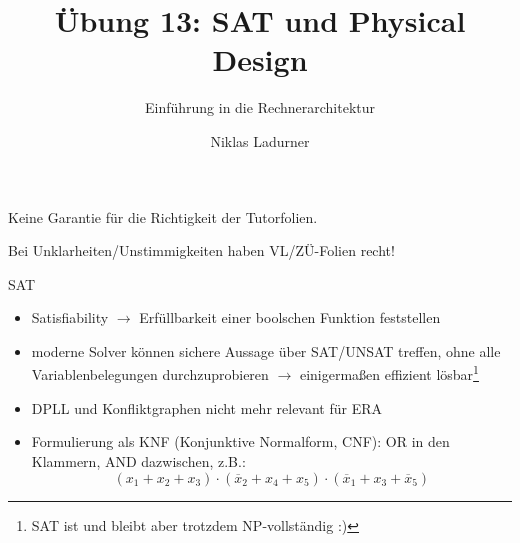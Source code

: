 \documentclass[
  german,            %
  aspectratio=169,    %
]{tumbeamer}
\title{Übung 13: SAT und Physical \\Design}
\subtitle{Einführung in die Rechnerarchitektur}
\author{Niklas Ladurner}
\institute{\theChairName\\\theDepartmentName\\\theUniversityName}
\date{\DTMdisplaydate{2025}{01}{24}{-1}}
\newcommand{\n}[1]{\overline{#1}}
\begin{document}
\maketitle

\begin{frame}[c, fragile]{}{}
	\begin{center}
		\LARGE  Keine Garantie für die Richtigkeit der Tutorfolien.

		\Large Bei Unklarheiten/Unstimmigkeiten haben VL/ZÜ-Folien recht!
	\end{center}
\end{frame}

\begin{frame}[c]{SAT}{}
	\begin{itemize}
		\item Satisfiability $\rightarrow$ Erfüllbarkeit einer boolschen Funktion feststellen
		\item moderne Solver können sichere Aussage über SAT/UNSAT treffen, ohne alle Variablenbelegungen durchzuprobieren $\rightarrow$ einigermaßen effizient lösbar\footnote{SAT ist und bleibt aber trotzdem NP-vollständig :)}
		\item DPLL und Konfliktgraphen nicht mehr relevant für ERA
		\item Formulierung als KNF (Konjunktive Normalform, CNF): OR in den Klammern, AND dazwischen, z.B.:\[
			      (x_1+x_2+x_3)\cdot(\n{x}_2+x_4+x_5)\cdot(\n{x}_1+x_3+\n{x}_5)\]
	\end{itemize}
\end{frame}
\end{document}
